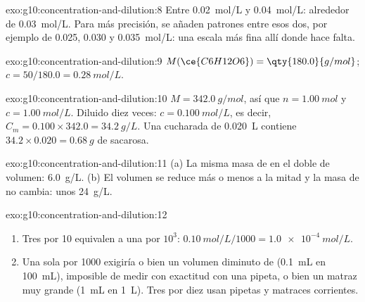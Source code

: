 \begin{solution}{exo:g10:concentration-and-dilution:8}
Entre \qty{0.02}{mol/L} y \qty{0.04}{mol/L}: alrededor de
\qty{0.03}{mol/L}. Para más precisión, se añaden patrones entre esos dos,
por ejemplo de 0.025, 0.030 y \qty{0.035}{mol/L}: una escala más fina
allí donde hace falta.
\end{solution}

\begin{solution}{exo:g10:concentration-and-dilution:9}
$M(\ce{C6H12O6}) = \qty{180.0}{g/mol}$; $c = 50 / 180.0 =
\qty{0.28}{mol/L}$.
\end{solution}

\begin{solution}{exo:g10:concentration-and-dilution:10}
$M = \qty{342.0}{g/mol}$, así que $n = \qty{1.00}{mol}$ y $c =
\qty{1.00}{mol/L}$. Diluido diez veces: $c = \qty{0.100}{mol/L}$, es
decir, $C_m = 0.100 \times 342.0 = \qty{34.2}{g/L}$. Una cucharada de
\qty{0.020}{L} contiene $34.2 \times 0.020 = \qty{0.68}{g}$ de sacarosa.
\end{solution}

\begin{solution}{exo:g10:concentration-and-dilution:11}
(a) La misma masa de  en el doble de volumen: \qty{6.0}{g/L}.
(b) El volumen se reduce más o menos a la mitad y la masa de  no
cambia: unos \qty{24}{g/L}.
\end{solution}

\begin{solution}{exo:g10:concentration-and-dilution:12}
\begin{enumerate}
  \item Tres  por 10 equivalen a una  por $10^3$:
        $\qty{0.10}{mol/L} / 1000 = \qty{1.0e-4}{mol/L}$.
  \item Una sola  por 1000 exigiría o bien un volumen diminuto
        de  (\qty{0.1}{mL} en \qty{100}{mL}), imposible
        de medir con exactitud con una pipeta, o bien un matraz muy
        grande (\qty{1}{mL} en \qty{1}{L}). Tres  por diez usan
        pipetas y matraces corrientes.
\end{enumerate}
\end{solution}

